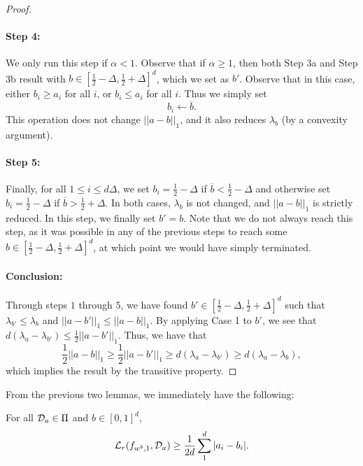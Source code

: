 \begin{proof}
\paragraph{Step 4:} We only run this step if $\alpha < 1$. Observe that if $\alpha \geq 1$, then both Step 3a and Step 3b result with $b \in [\frac{1}{2} - \Delta, \frac{1}{2} + \Delta]^d$, which we set as $b'$. Observe that in this case, either $b_i \geq a_i$ for all $i$, or $b_i \leq a_i$ for all $i$. Thus we simply set $$b_i \leftarrow \overline{b}.$$ This operation does not change $||a - b||_1$, and it also reduces $\lambda_b$ (by a convexity argument). 

\paragraph{Step 5:} Finally, for all $1 \leq i \leq d\Delta$, we set $b_i = \frac{1}{2}-\Delta$ if $\overline{b} < \frac{1}{2} - \Delta$ and otherwise set $b_i = \frac{1}{2} - \Delta$ if $\overline{b} > \frac{1}{2} + \Delta$. In both cases, $\lambda_b$ is not changed, and $||a-b||_1$ is strictly reduced. In this step, we finally set $b' = b$. Note that we do not always reach this step, as it was possible in any of the previous steps to reach some $b \in [\frac{1}{2} - \Delta, \frac{1}{2} + \Delta]^d$, at which point we would have simply terminated.

\paragraph{Conclusion: } Through steps $1$ through $5$, we have found $b' \in [\frac{1}{2} - \Delta, \frac{1}{2} + \Delta]^d$ such that $\lambda_{b'} \leq \lambda_b$ and $||a - b'||_1 \leq ||a - b||_1$. By applying Case 1 to $b'$, we see that $d(\lambda_a - \lambda_{b'}) \leq \frac{1}{2}||a - b'||_1$. Thus, we have that $$\frac{1}{2}||a - b||_1 \geq \frac{1}{2}||a - b'||_1 \geq d(\lambda_a - \lambda_{b'}) \geq d(\lambda_a - \lambda_b),$$ which implies the result by the transitive property.


\end{proof}

From the previous two lemmas, we immediately have the following:
\begin{cor}\label{cor:l_1distancebound}
For all ${\mathcal D}_a \in \Pi$ and $b \in [0,1]^d$, $$\mathcal L_r(f_{w^b, 1}, {\mathcal D}_a) \geq \frac{1}{2d}\sum_1^d |a_i - b_i|.$$
\end{cor}

